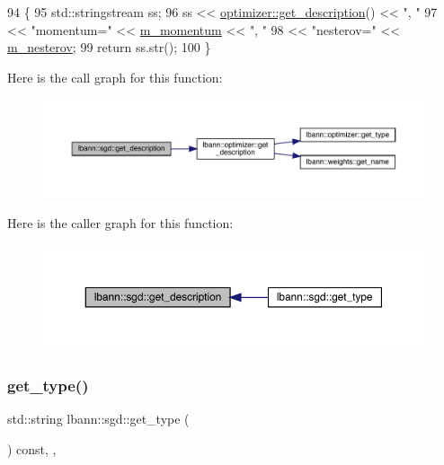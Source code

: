 \begin{DoxyCode}
94                                      \{
95   std::stringstream ss;
96   ss << \hyperlink{classlbann_1_1optimizer_a66bb8d28dfb41452ac1a75a3efd47723}{optimizer::get\_description}() << \textcolor{stringliteral}{", "}
97      << \textcolor{stringliteral}{"momentum="} << \hyperlink{classlbann_1_1sgd_a2e56d66d350debcf0d2c3ad76c214074}{m\_momentum} << \textcolor{stringliteral}{", "}
98      << \textcolor{stringliteral}{"nesterov="} << \hyperlink{classlbann_1_1sgd_a82da488e5d1530f50f67cd4ea30909cb}{m\_nesterov};
99   \textcolor{keywordflow}{return} ss.str();
100 \}
\end{DoxyCode}
Here is the call graph for this function\+:\nopagebreak
\begin{figure}[H]
\begin{center}
\leavevmode
\includegraphics[width=350pt]{classlbann_1_1sgd_a2022661b9ef83e418a0a980207cb231e_cgraph}
\end{center}
\end{figure}
Here is the caller graph for this function\+:\nopagebreak
\begin{figure}[H]
\begin{center}
\leavevmode
\includegraphics[width=350pt]{classlbann_1_1sgd_a2022661b9ef83e418a0a980207cb231e_icgraph}
\end{center}
\end{figure}
\mbox{\label{classlbann_1_1sgd_ad24efbeadae61890d07fa9e95aa91c61}} 
\subsubsection{\texorpdfstring{get\+\_\+type()}{get\_type()}}
{\footnotesize\ttfamily std\+::string lbann\+::sgd\+::get\+\_\+type (\begin{DoxyParamCaption}{ }\end{DoxyParamCaption}) const\hspace{0.3cm}{\ttfamily [inline]}, {\ttfamily [override]}, {\ttfamily [virtual]}}

